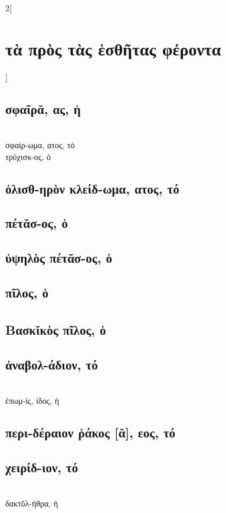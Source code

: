 \documentclass{book}
\begin{document}
\begin{multicols}{2}[\section{τὰ πρὸς τὰς ἑσθῆτας φέροντα}]
\subsection{σφαῖρᾰ, ας, ἡ}   ~\\
σφαίρ-ωμα, ατος, τό                 ~\\
τρόχισκ-ος, ὁ 
\subsection{ὀλισθ-ηρὸν κλείδ-ωμα, ατος, τό} 
\subsection{πέτᾰσ-ος, ὁ}
\subsection{ὑψηλὸς πέτᾰσ-ος, ὁ}
\subsection{πῖλος, ὁ}
\subsection{Βασκῐκὸς\textsuperscript{\textdagger} πῖλος, ὁ}
\subsection{ἀναβολ-άδιον, τό}  ~\\
{ἐπωμ-ίς, ίδος, ἡ} 
\subsection{περι-δέραιον ῥάκος [ᾰ], εος, τό}
\subsection{χειρίδ-ιον, τό}  ~\\
δακτῠλ-ήθρα, ἡ

\end{multicols}
\end{document}

